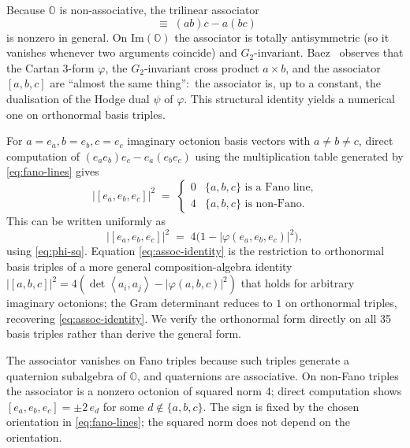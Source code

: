 \documentclass[11pt]{article}
\newcommand{\ip}[2]{\left\langle#1,#2\right\rangle}
\begin{document}
Because $\mathbb{O}$ is non-associative, the trilinear associator
\begin{equation}
  [a, b, c] \;\equiv\; (ab)c - a(bc)
  \label{eq:associator}
\end{equation}
is nonzero in general.  On $\mathrm{Im}(\mathbb{O})$ the associator
is totally antisymmetric (so it vanishes whenever two arguments
coincide) and $G_2$-invariant.  Baez~\cite[\S4.1]{baez-octonions}
observes that the Cartan 3-form $\varphi$, the $G_2$-invariant
cross product $a \times b$, and the associator $[a, b, c]$ are
``almost the same thing'':\ the associator is, up to a constant,
the dualisation of the Hodge dual $\psi$ of $\varphi$.  This
structural identity yields a numerical one on orthonormal basis
triples.

For $a = e_a, b = e_b, c = e_c$ imaginary octonion basis vectors
with $a \neq b \neq c$, direct computation of
$(e_a e_b) e_c - e_a (e_b e_c)$ using the multiplication table
generated by \eqref{eq:fano-lines} gives
\begin{equation}
  |[e_a, e_b, e_c]|^2 \;=\;
  \begin{cases} 0 & \{a,b,c\} \text{ is a Fano line,} \\
                4 & \{a,b,c\} \text{ is non-Fano.}
  \end{cases}
  \label{eq:assoc-basis}
\end{equation}
This can be written uniformly as
\begin{equation}
  |[e_a, e_b, e_c]|^2 \;=\;
  4\bigl(1 - |\varphi(e_a, e_b, e_c)|^2\bigr),
  \label{eq:assoc-identity}
\end{equation}
using \eqref{eq:phi-sq}.  Equation \eqref{eq:assoc-identity} is
the restriction to orthonormal basis triples of a more general
composition-algebra identity
$|[a,b,c]|^2 = 4(\det \ip{a_i}{a_j} - |\varphi(a,b,c)|^2)$
that holds for arbitrary imaginary octonions; the Gram
determinant reduces to $1$ on orthonormal triples, recovering
\eqref{eq:assoc-identity}.  We verify the orthonormal form
directly on all 35 basis triples rather than derive the general
form.

The associator vanishes on Fano triples because such triples
generate a quaternion subalgebra of $\mathbb{O}$, and quaternions
are associative.  On non-Fano triples the associator is a
nonzero octonion of squared norm $4$; direct computation shows
$[e_a, e_b, e_c] = \pm 2\, e_d$ for some
$d \notin \{a, b, c\}$.  The sign is fixed by the chosen
orientation in \eqref{eq:fano-lines}; the squared norm does not
depend on the orientation.
\end{document}
